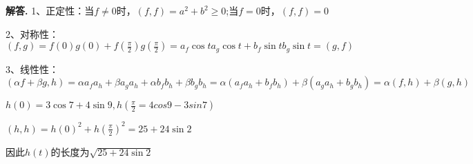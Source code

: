 \documentclass[12pt, a4paper, oneside]{ctexart}
\newcounter{problemname}
\newenvironment{solution}{\par\noindent\textbf{解答. }}{\par}
\newenvironment{note}{\par\noindent\textbf{题目\arabic{problemname}的注记. }}{\par}
\begin{document}
\begin{solution}
    1、正定性：当$f\neq 0$时，$(f,f)=a^2+b^2\geq 0$;当$f=0$时，$(f,f)=0$

    2、对称性：$(f,g)=f(0)g(0)+f( \frac{\pi}{2})g(\frac{\pi}{2})=a_f \cos t a_g \cos t+b_f \sin t b_g \sin t=(g,f)$
    
    3、线性性：$(\alpha f+\beta g,h)=\alpha a_f a_h+ \beta a_g a_h+ \alpha b_f b_h +\beta b_g b_h=\alpha(a_f a_h+b_f b_h)+\beta(a_g a_h+b_g b_h)=\alpha(f,h)+\beta(g,h)$

    $h(0)=3\cos7+4\sin9,h(\frac{\pi}{2}=4cos9-3sin7)$

    $(h,h)=h(0)^2+h(\frac{\pi}{2})^2=25+24\sin2$

    因此$h(t)$的长度为$\sqrt{25+24\sin2}$
\end{solution}

\end{document}
